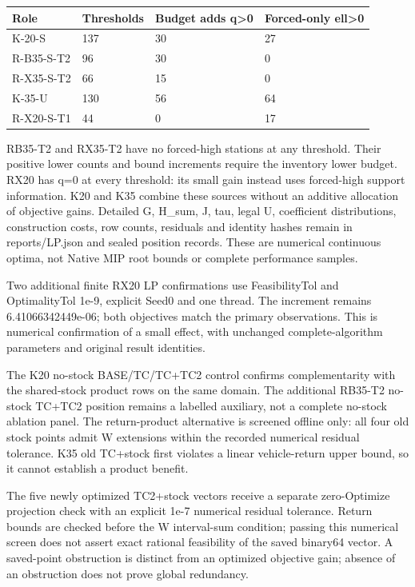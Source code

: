 \documentclass[
  american,
  11pt,
]{article}
\newcounter{none} %
\begin{document}

{\def\LTcaptype{none} %
\begin{longtable}[]{@{}llll@{}}
\toprule\noalign{}
Role & Thresholds & Budget adds q\textgreater0 & Forced-only
ell\textgreater0 \\
\midrule\noalign{}
\endhead
\bottomrule\noalign{}
\endlastfoot
K-20-S & 137 & 30 & 27 \\
R-B35-S-T2 & 96 & 30 & 0 \\
R-X35-S-T2 & 66 & 15 & 0 \\
K-35-U & 130 & 56 & 64 \\
R-X20-S-T1 & 44 & 0 & 17 \\
\end{longtable}
}

RB35-T2 and RX35-T2 have no forced-high stations at any threshold. Their
positive lower counts and bound increments require the inventory lower
budget. RX20 has q=0 at every threshold: its small gain instead uses
forced-high support information. K20 and K35 combine these sources
without an additive allocation of objective gains. Detailed G, H\_\allowbreak{}sum,
J, tau, legal U, coefficient distributions, construction costs, row
counts, residuals and identity hashes remain in reports/LP.json and
sealed position records. These are numerical continuous optima, not
Native MIP root bounds or complete performance samples.

Two additional finite RX20 LP confirmations use FeasibilityTol and
OptimalityTol 1e-9, explicit Seed0 and one thread. The increment remains
6.41066342449e-06; both objectives match the primary observations. This
is numerical confirmation of a small effect, with unchanged
complete-algorithm parameters and original result identities.

The K20 no-stock BASE/TC/TC+TC2 control confirms complementarity with
the shared-stock product rows on the same domain. The additional RB35-T2
no-stock TC+TC2 position remains a labelled auxiliary, not a complete
no-stock ablation panel. The return-product alternative is screened
offline only: all four old stock points admit W extensions within the
recorded numerical residual tolerance. K35 old TC+stock first violates a
linear vehicle-return upper bound, so it cannot establish a product
benefit.

The five newly optimized TC2+stock vectors receive a separate
zero-Optimize projection check with an explicit 1e-7 numerical residual
tolerance. Return bounds are checked before the W interval-sum
condition; passing this numerical screen does not assert exact rational
feasibility of the saved binary64 vector. A saved-point obstruction is
distinct from an optimized objective gain; absence of an obstruction
does not prove global redundancy.
\end{document}
